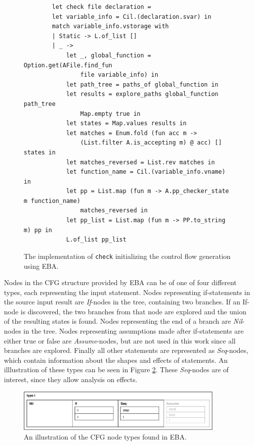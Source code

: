 \begin{figure}[H]
    \centering
    \begin{verbatim}
        let check file declaration =
        let variable_info = Cil.(declaration.svar) in
        match variable_info.vstorage with 
        | Static -> L.of_list []
        | _ ->
            let _, global_function = Option.get(AFile.find_fun 
                file variable_info) in
            let path_tree = paths_of global_function in
            let results = explore_paths global_function path_tree 
                Map.empty true in 
            let states = Map.values results in
            let matches = Enum.fold (fun acc m -> 
                (List.filter A.is_accepting m) @ acc) [] states in
            let matches_reversed = List.rev matches in 
            let function_name = Cil.(variable_info.vname) in 
            let pp = List.map (fun m -> A.pp_checker_state m function_name) 
                matches_reversed in
            let pp_list = List.map (fun m -> PP.to_string m) pp in
            L.of_list pp_list
    \end{verbatim}
    \caption{The implementation of \texttt{check} initializing the control flow generation using EBA.}
    \label{check-implementation}
\end{figure}

\newpar Nodes in the CFG structure provided by EBA can be of one of four different types, each representing the input statement. Nodes representing if-statements in the source input result are \textit{If}-nodes in the tree, containing two branches. If an If-node is discovered, the two branches from that node are explored and the union of the resulting states is found. Nodes representing the end of a branch are \textit{Nil}-nodes in the tree. Nodes representing assumptions made after if-statements are either true or false are \textit{Assume}-nodes, but are not used in this work since all branches are explored. Finally all other statements are represented as \textit{Seq}-nodes, which contain information about the shapes and effects of statements. An illlustration of these types can be seen in Figure \ref{cfg-nodes}. These \textit{Seq}-nodes are of interest, since they allow analysis on effects.  

\begin{figure}[H]
    \centering
    \includegraphics[width=0.9\textwidth]{implementation/figures/node}
    \caption{An illustration of the CFG node types found in EBA.}
    \label{cfg-nodes}
\end{figure}

